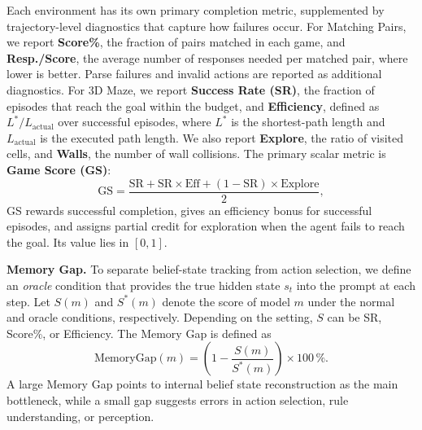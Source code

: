 \documentclass{llmxive}
\providecommand{\paragraph}[1]{\vspace{1mm}\noindent\textbf{#1}}
\begin{document}
Each environment has its own primary completion metric, supplemented by trajectory-level diagnostics that capture how failures occur. 
For Matching Pairs, we report \textbf{Score\%}, the fraction of pairs matched in each game, and \textbf{Resp./Score}, the average number of responses needed per matched pair, where lower is better. Parse failures and invalid actions are reported as additional diagnostics.
For 3D Maze, we report \textbf{Success Rate (SR)}, the fraction of episodes that reach the goal within the budget, and \textbf{Efficiency}, defined as $L^*/L_{\text{actual}}$ over successful episodes, where $L^*$ is the shortest-path length and $L_{\text{actual}}$ is the executed path length. We also report \textbf{Explore}, the ratio of visited cells, and \textbf{Walls}, the number of wall collisions. The primary scalar metric is \textbf{Game Score (GS)}:
\begin{equation}
\label{eq:game_score}
\text{GS} = \frac{\text{SR} + \text{SR}{\times}\text{Eff} + (1{-}\text{SR}){\times}\text{Explore}}{2},
\end{equation}
GS rewards successful completion, gives an efficiency bonus for successful episodes, and assigns partial credit for exploration when the agent fails to reach the goal. Its value lies in $[0,1]$.



\paragraph{Memory Gap.}
To separate belief-state tracking from action selection, we define an \emph{oracle} condition that provides the true hidden state $s_t$ into the prompt at each step. Let $S(m)$ and $S^*(m)$ denote the score of model $m$ under the normal and oracle conditions, respectively. Depending on the setting, $S$ can be SR, Score\%, or Efficiency. The Memory Gap is defined as
\begin{equation}
\label{eq:memorygap}
\text{MemoryGap}(m) = \left(1 - \frac{S(m)}{S^*(m)}\right) \times 100\,\%.
\end{equation}
A large Memory Gap points to internal belief state reconstruction as the main bottleneck, while a small gap suggests errors in action selection, rule understanding, or perception.
\end{document}
